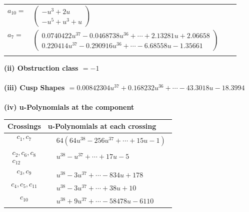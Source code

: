 \documentclass[1p]{elsarticle_modified}
\theoremstyle{definition}
\begin{document}
\begin{tabular}{m{7pt} m{180pt} m{7pt} m{180pt} }
\flushright $a_{10}=$&$\begin{pmatrix}- u^3+2 u\\- u^5+u^3+u\end{pmatrix}$ \\
\flushright $a_{7}=$&$\begin{pmatrix}0.0740422 u^{37}-0.0468738 u^{36}+\cdots+2.13281 u+2.06658\\0.220414 u^{37}-0.290916 u^{36}+\cdots-6.68558 u-1.35661\end{pmatrix}$\\&\end{tabular}
\flushleft \textbf{(ii) Obstruction class $= -1$}\\~\\
\flushleft \textbf{(iii) Cusp Shapes $= 0.00842304 u^{37}+0.168232 u^{36}+\cdots-43.3018 u-18.3994$}\\~\\
\newpage\renewcommand{\arraystretch}{1}
\flushleft \textbf{(iv) u-Polynomials at the component}\newline \\
\begin{tabular}{m{50pt}|m{274pt}}
Crossings & \hspace{64pt}u-Polynomials at each crossing \\
\hline $$\begin{aligned}c_{1},c_{7}\end{aligned}$$&$\begin{aligned}
&64(64 u^{38}-256 u^{37}+\cdots+15 u-1)
\end{aligned}$\\
\hline $$\begin{aligned}c_{2},c_{6},c_{8}\\c_{12}\end{aligned}$$&$\begin{aligned}
&u^{38}- u^{37}+\cdots+17 u-5
\end{aligned}$\\
\hline $$\begin{aligned}c_{3},c_{9}\end{aligned}$$&$\begin{aligned}
&u^{38}-3 u^{37}+\cdots-834 u+178
\end{aligned}$\\
\hline $$\begin{aligned}c_{4},c_{5},c_{11}\end{aligned}$$&$\begin{aligned}
&u^{38}-3 u^{37}+\cdots+38 u+10
\end{aligned}$\\
\hline $$\begin{aligned}c_{10}\end{aligned}$$&$\begin{aligned}
&u^{38}+9 u^{37}+\cdots-58478 u-6110
\end{aligned}$\\
\hline
\end{tabular}\\~\\
\end{document}
